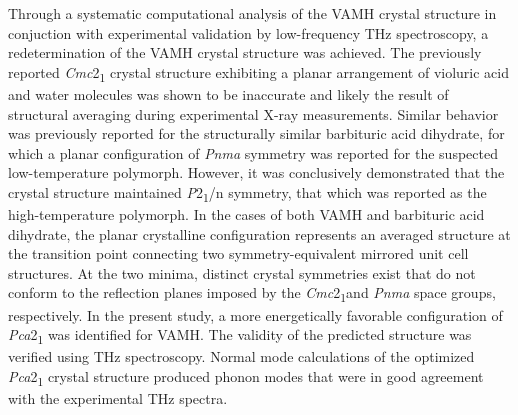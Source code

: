 Through a systematic computational analysis of the VAMH crystal structure in conjuction with experimental validation by low-frequency THz spectroscopy, a redetermination of the VAMH crystal structure was achieved. The previously reported \textit{Cmc}2\textsubscript{1} crystal structure exhibiting a planar arrangement of violuric acid and water molecules was shown to be inaccurate and likely the result of structural averaging during experimental X-ray measurements. Similar behavior was previously reported for the structurally similar barbituric acid dihydrate, for which a planar configuration  of \textit{Pnma} symmetry was reported for the suspected low-temperature polymorph. However, it was conclusively demonstrated that the crystal structure maintained \textit{P}2\textsubscript{1}/n symmetry, that which was reported as the high-temperature polymorph. In the cases of both VAMH and barbituric acid dihydrate, the planar crystalline configuration represents an averaged structure at the transition point connecting two symmetry-equivalent mirrored unit cell structures. At the two minima, distinct crystal symmetries exist that do not conform to the reflection planes imposed by the \textit{Cmc}2\textsubscript{1}and \textit{Pnma} space groups, respectively. In the present study, a more energetically favorable configuration of \textit{Pca}2\textsubscript{1} was identified for VAMH. The validity of the predicted structure was verified using THz spectroscopy. Normal mode calculations of the optimized \textit{Pca}2\textsubscript{1} crystal structure produced phonon modes that were in good agreement with the experimental THz spectra. 

